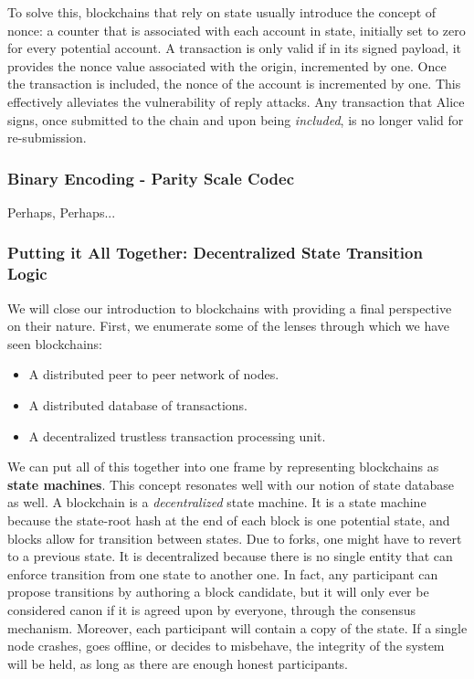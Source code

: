 To solve this, blockchains that rely on state usually introduce the concept of nonce: a counter that
is associated with each account in state, initially set to zero for every potential account. A
transaction is only valid if in its signed payload, it provides the nonce value associated with the
origin, incremented by one. Once the transaction is included, the nonce of the account is
incremented by one. This effectively alleviates the vulnerability of reply attacks. Any transaction
that Alice signs, once submitted to the chain and upon being \textit{included}, is no longer valid
for re-submission.

\subsubsection{Binary Encoding - Parity Scale Codec}

Perhaps, Perhaps...

\subsubsection{Putting it All Together: Decentralized State Transition Logic} \label{chap_bg:subsec:decentralized_state_machine}

We will close our introduction to blockchains with providing a final perspective on their nature.
First, we enumerate some of the lenses through which we have seen blockchains:

\begin{itemize}
	\item A distributed peer to peer network of nodes.
	\item A distributed database of transactions.
	\item A decentralized trustless transaction processing unit.
\end{itemize}

We can put all of this together into one frame by representing blockchains as \textbf{state
machines}. This concept resonates well with our notion of state database as well. A blockchain is a
\textit{decentralized} state machine. It is a state machine because the state-root hash at the end
of each block is one potential state, and blocks allow for transition between states. Due to forks,
one might have to revert to a previous state. It is decentralized because there is no single entity
that can enforce transition from one state to another one. In fact, any participant can propose
transitions by authoring a block candidate, but it will only ever be considered canon if it is
agreed upon by everyone, through the consensus mechanism. Moreover, each participant will contain a
copy of the state. If a single node crashes, goes offline, or decides to misbehave, the integrity of
the system will be held, as long as there are enough honest participants.



